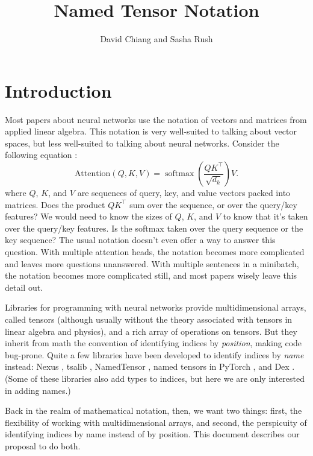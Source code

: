 \documentclass{article}
\title{Named Tensor Notation}
\author{David Chiang and Sasha Rush}
\DeclareMathOperator*{\softmax}{softmax}
\begin{document}
\maketitle

\tableofcontents

\section{Introduction}

Most papers about neural networks use the notation of vectors and matrices from applied linear algebra. This notation is very well-suited to talking about vector spaces, but less well-suited to talking about neural networks. Consider the following equation \citep{vaswani+:2017}:
\[ \text{Attention}(Q, K, V) = \softmax \left( \frac{QK^\top}{\sqrt{d_k}} \right) V. \]
where $Q$, $K$, and $V$ are sequences of query, key, and value vectors packed into matrices. Does the product $QK^\top$ sum over the sequence, or over the query/key features? We would need to know the sizes of $Q$, $K$, and $V$ to know that it's taken over the query/key features. Is the softmax taken over the query sequence or the key sequence? The usual notation doesn't even offer a way to answer this question. With multiple attention heads, the notation becomes more complicated and leaves more questions unanswered. With multiple sentences in a minibatch, the notation becomes more complicated still, and most papers wisely leave this detail out.

Libraries for programming with neural networks \citep{numpy,pytorch} provide multidimensional arrays, called tensors (although usually without the theory associated with tensors in linear algebra and physics), and a rich array of operations on tensors. But they inherit from math the convention of identifying indices by \emph{position}, making code bug-prone. Quite a few libraries have been developed to identify indices by \emph{name} instead: Nexus \citep{chen2017typesafe}, tsalib \citep{tsalib}, NamedTensor \citep{namedtensor}, named tensors in PyTorch \citep{named-tensors}, and Dex \citep{maclaurin+:2019}. (Some of these libraries also add types to indices, but here we are only interested in adding names.)

Back in the realm of mathematical notation, then, we want two things: first, the flexibility of working with multidimensional arrays, and second, the perspicuity of identifying indices by name instead of by position. This document describes our proposal to do both.
\end{document}
